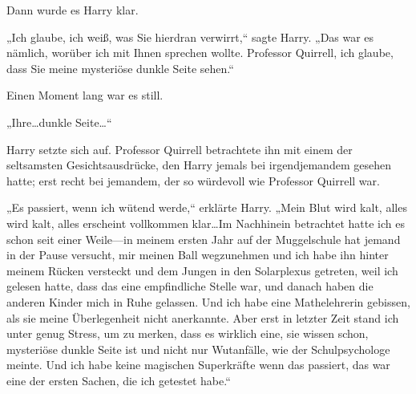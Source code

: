 Dann wurde es Harry klar.

„Ich glaube, ich weiß, was Sie hierdran verwirrt,“ sagte Harry. „Das war es nämlich, worüber ich mit Ihnen sprechen wollte. Professor Quirrell, ich glaube, dass Sie meine mysteriöse dunkle Seite sehen.“

Einen Moment lang war es still.

„Ihre…dunkle Seite…“

Harry setzte sich auf. Professor Quirrell betrachtete ihn mit einem der seltsamsten Gesichtsausdrücke, den Harry jemals bei irgendjemandem gesehen hatte; erst recht bei jemandem, der so würdevoll wie Professor Quirrell war.

„Es passiert, wenn ich wütend werde,“ erklärte Harry. „Mein Blut wird kalt, alles wird kalt, alles erscheint vollkommen klar…Im Nachhinein betrachtet hatte ich es schon seit einer Weile—in meinem ersten Jahr auf der Muggelschule hat jemand in der Pause versucht, mir meinen Ball wegzunehmen und ich habe ihn hinter meinem Rücken versteckt und dem Jungen in den Solarplexus getreten, weil ich gelesen hatte, dass das eine empfindliche Stelle war, und danach haben die anderen Kinder mich in Ruhe gelassen. Und ich habe eine Mathelehrerin gebissen, als sie meine Überlegenheit nicht anerkannte. Aber erst in letzter Zeit stand ich unter genug Stress, um zu merken, dass es wirklich eine, sie wissen schon, mysteriöse dunkle Seite ist und nicht nur Wutanfälle, wie der Schulpsychologe meinte. Und ich habe keine magischen Superkräfte wenn das passiert, das war eine der ersten Sachen, die ich getestet habe.“


